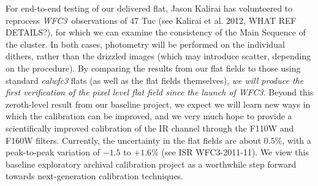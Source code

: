 \documentclass[12pt]{article}
\newcommand{\project}[1]{\textsl{#1}}
\newcommand{\WFC}{\project{WFC3}}
\begin{document}
For end-to-end testing of our delivered flat, Jason
Kalirai has volunteered to reprocess \WFC\ observations of 47 Tuc (see
Kalirai et al. 2012, WHAT REF DETAILS?), for which we can examine the
consistency of the Main Sequence of the cluster.  In both cases,
photometry will be performed on the individual dithers, rather than
the drizzled images (which may introduce scatter, depending on the
procedure).  By comparing the results from our flat fields to those
using standard \emph{calwfc3} flats (as well as the flat fields
themselves), \emph{we will produce the first verification of the pixel
  level flat field since the launch of \WFC}.  Beyond this zeroth-level
result from our baseline project, we expect we will learn new ways in
which the calibration can be improved, and we very much hope to provide a scientifically
improved calibration of the IR channel through the F110W and F160W filters.  Currently, the
uncertainty in the flat fields are about $0.5\%$, with a peak-to-peak
variation of $-1.5$ to $+1.6\%$ (see ISR WFC3-2011-11).  We view this
baseline exploratory archival calibration project as a worthwhile step forward
towards next-generation calibration techniques.
\end{document}
